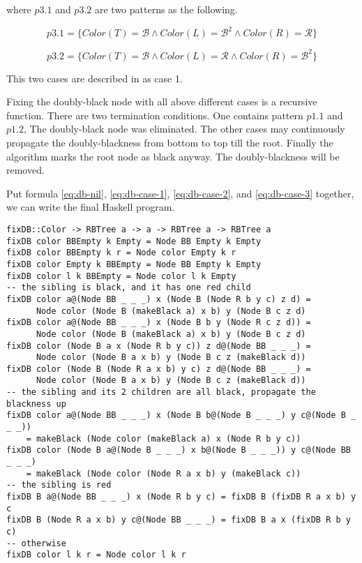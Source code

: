 \documentclass{article}
\begin{document}
where $p 3.1$ and $p 3.2$ are two patterns as the following.

\[
p 3.1 = \{ Color(T) = \mathcal{B} \land Color(L) = \mathcal{B}^2 \land Color(R) = \mathcal{R} \}
\]

\[
p 3.2 = \{ Color(T) = \mathcal{B} \land Color(L) = \mathcal{R} \land Color(R) = \mathcal{B}^2 \}
\]


This two cases are described in \cite{CLRS} as case 1.

Fixing the doubly-black node with all above different cases is a recursive function.
There are two termination conditions. One contains pattern $p 1.1$ and $p 1.2$,
The doubly-black node was eliminated. The other cases may continuously propagate the
doubly-blackness from bottom to top till the root.
Finally the algorithm marks the root node as black anyway. The doubly-blackness will be
removed.

Put formula \ref{eq:db-nil}, \ref{eq:db-case-1}, \ref{eq:db-case-2}, and \ref{eq:db-case-3}
together, we can write the final Haskell program.

\begin{lstlisting}
fixDB::Color -> RBTree a -> a -> RBTree a -> RBTree a
fixDB color BBEmpty k Empty = Node BB Empty k Empty
fixDB color BBEmpty k r = Node color Empty k r
fixDB color Empty k BBEmpty = Node BB Empty k Empty
fixDB color l k BBEmpty = Node color l k Empty
-- the sibling is black, and it has one red child
fixDB color a@(Node BB _ _ _) x (Node B (Node R b y c) z d) =
      Node color (Node B (makeBlack a) x b) y (Node B c z d)
fixDB color a@(Node BB _ _ _) x (Node B b y (Node R c z d)) =
      Node color (Node B (makeBlack a) x b) y (Node B c z d)
fixDB color (Node B a x (Node R b y c)) z d@(Node BB _ _ _) =
      Node color (Node B a x b) y (Node B c z (makeBlack d))
fixDB color (Node B (Node R a x b) y c) z d@(Node BB _ _ _) =
      Node color (Node B a x b) y (Node B c z (makeBlack d))
-- the sibling and its 2 children are all black, propagate the blackness up
fixDB color a@(Node BB _ _ _) x (Node B b@(Node B _ _ _) y c@(Node B _ _ _))
    = makeBlack (Node color (makeBlack a) x (Node R b y c))
fixDB color (Node B a@(Node B _ _ _) x b@(Node B _ _ _)) y c@(Node BB _ _ _)
    = makeBlack (Node color (Node R a x b) y (makeBlack c))
-- the sibling is red
fixDB B a@(Node BB _ _ _) x (Node R b y c) = fixDB B (fixDB R a x b) y c
fixDB B (Node R a x b) y c@(Node BB _ _ _) = fixDB B a x (fixDB R b y c)
-- otherwise
fixDB color l k r = Node color l k r
\end{lstlisting}
\end{document}
